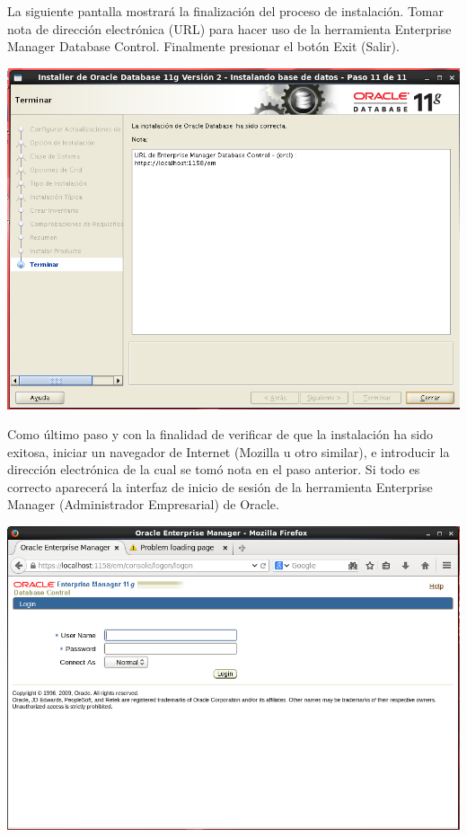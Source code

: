 \vspace{\baselineskip}

La siguiente pantalla mostrará la finalización del proceso de instalación. Tomar nota de dirección electrónica (URL) para hacer uso de la herramienta Enterprise Manager Database Control. Finalmente presionar el botón Exit (Salir).
\begin{center}
	\includegraphics[width=16cm]{./Imagenes/87} 
\end{center}

\vspace{\baselineskip}

Como último paso y con la finalidad de verificar de que la instalación ha sido exitosa, iniciar un navegador de Internet (Mozilla u otro similar), e introducir la dirección electrónica de la cual se tomó nota en el paso anterior. Si todo es correcto aparecerá la interfaz de inicio de sesión de la herramienta Enterprise Manager (Administrador Empresarial) de Oracle.
\begin{center}
	\includegraphics[width=16cm]{./Imagenes/91} 
\end{center}


